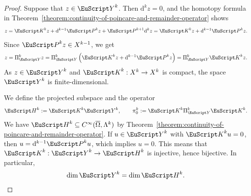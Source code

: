 \documentclass[10pt,a4paper]{amsart}
\theoremstyle{definition}
\theoremstyle{remark}
\numberwithin{equation}{section}
\newcommand{\euH}{{\EuScript H}}
\newcommand{\euK}{{\EuScript K}}
\newcommand{\euP}{{\EuScript P}}
\newcommand{\closure}{\overline}
\newcommand{\cartan}{{\mathrm d}}
\newcommand{\Domain}{{\Omega}}
\newcommand{\Alt}[1]{\Lambda^{#1}}
\newcommand{\Proj}{\pi}
\newcommand{\Projection}{\Pi}
\newcommand{\Poincare}{\euP}
\newcommand{\Defect}{\euK}
\newcommand{\Harmonic}{{\euH}}
\begin{document}
\begin{proof}
    Suppose that $z \in \Hilbertcomplement^{k}$. Then $\cartan^{k} z = 0$, and the homotopy formula in Theorem~\ref{theorem:continuity-of-poincare-and-remainder-operator} shows 
    \begin{align*}
        z
        = 
        \Defect^{k} z + \cartan^{k-1} \Poincare^{k} z + \Poincare^{k+1} \cartan^{k} z
        = 
        \Defect^{k} z + \cartan^{k-1} \Poincare^{k} z
        .
    \end{align*}
    Since $\Poincare^{k} z \in X^{k-1}$, we get
    \begin{align*}
         z 
         = 
         \Projection_{\Hilbertcomplement}^{k} z
         = 
         \Projection_{\Hilbertcomplement}^{k} \left( \Defect^{k} z + \cartan^{k-1} \Poincare^{k} z \right)
         = 
         \Projection_{\Hilbertcomplement}^{k} \Defect^{k} z
         .
    \end{align*}
    As $z \in \Hilbertcomplement^{k}$ and $\Defect^{k} : X^{k} \to X^{k}$ is compact, the space $\Hilbertcomplement^{k}$ is finite-dimensional. 
    
    We define the projected subspace and the operator 
    \begin{align*}
        \Harmonic^{k} := \Defect^{k} \Hilbertcomplement^{k}, \qquad \Proj^{k}_{0} := \Defect^{k} \Projection_{\Hilbertcomplement}^{k} \Defect^{k}.
    \end{align*}
    We have $\Harmonic^{k} \subseteq C^{\infty}(\closure\Domain,\Alt{k})$ by Theorem~\ref{theorem:continuity-of-poincare-and-remainder-operator}.
    If $u \in \Hilbertcomplement^{k}$ with $\Defect^{k} u = 0$, then $u = \cartan^{k-1} \Poincare^{k} u$, which implies $u = 0$.
    This means that $\Defect^{k} : \Hilbertcomplement^{k} \to \Harmonic^{k}$ is injective, hence bijective. 
    In particular, 
    \begin{align*}
        \dim \Hilbertcomplement^{k} = \dim \Harmonic^{k}.
    \end{align*}
    

\end{proof}
\end{document}
